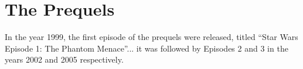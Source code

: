 
\part{The Prequels}
	\label{part:prequels}%



In the year 1999, the first episode of the prequels were released, titled ``Star Wars Episode 1: The Phantom Menace''... it was followed by Episodes 2 and 3 in the years 2002 and 2005 respectively.



